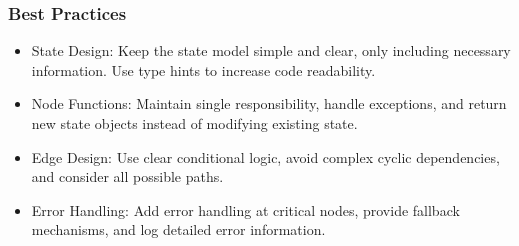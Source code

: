 
		
				




		
				



\begin{frame}[fragile]\frametitle{Best Practices}

      \begin{itemize}
        \item State Design: Keep the state model simple and clear, only including necessary information. Use type hints to increase code readability.
        \item Node Functions: Maintain single responsibility, handle exceptions, and return new state objects instead of modifying existing state.
        \item Edge Design: Use clear conditional logic, avoid complex cyclic dependencies, and consider all possible paths.
        \item Error Handling: Add error handling at critical nodes, provide fallback mechanisms, and log detailed error information.
      \end{itemize}
\end{frame}
